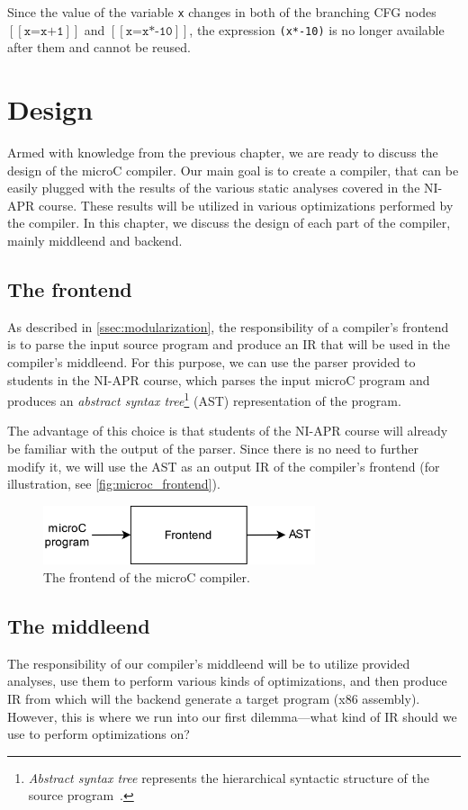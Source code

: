\documentclass[thesis=M,english]{FITthesis}[2019/12/23]
\begin{document}
Since the value of the variable \texttt{x} changes in both of the branching CFG nodes $[\![ \texttt{x=x+1} ]\!]$ and $[\![ \texttt{x=x*-10} ]\!]$, the expression \texttt{(x*-10)} is no longer available after them and cannot be reused.

\chapter{Design}
Armed with knowledge from the previous chapter, we are ready to discuss the design of the microC compiler. Our main goal is to create a compiler, that can be easily plugged with the results of the various static analyses covered in the NI-APR course. These results will be utilized in various optimizations performed by the compiler. In this chapter, we discuss the design of each part of the compiler, mainly middleend and backend.

\section{The frontend}\label{sec:frontend}
As described in \autoref{ssec:modularization}, the responsibility of a compiler's frontend is to parse the input source program and produce an IR that will be used in the compiler's middleend. For this purpose, we can use the parser provided to students in the NI-APR course, which parses the input microC program and produces an \emph{abstract syntax tree}\footnote{\emph{Abstract syntax tree} represents the hierarchical syntactic structure of the source program~\cite[Chap. 2.1]{dragonbook}.} (AST) representation of the program.

The advantage of this choice is that students of the NI-APR course will already be familiar with the output of the parser. Since there is no need to further modify it, we will use the AST as an output IR of the compiler's frontend (for illustration, see \autoref{fig:microc_frontend}).

\begin{figure}
    \centering
    \includegraphics[width=8cm]{img/microc_frontend.png}
    \caption{The frontend of the microC compiler.}\label{fig:microc_frontend}
\end{figure}


\section{The middleend}\label{sec:middleend}
The responsibility of our compiler's middleend will be to utilize provided analyses, use them to perform various kinds of optimizations, and then produce IR from which will the backend generate a target program (x86 assembly). However, this is where we run into our first dilemma---what kind of IR should we use to perform optimizations on?
\end{document}
